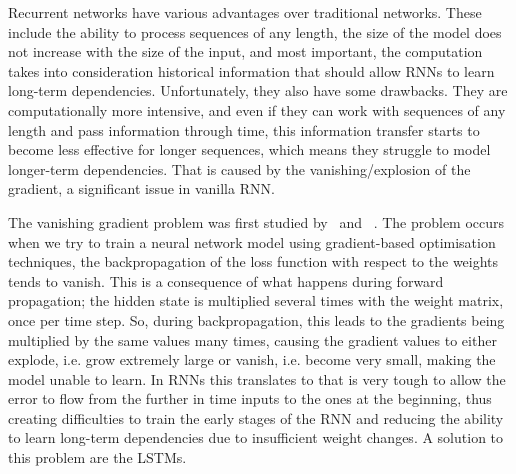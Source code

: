 Recurrent networks have various advantages over traditional networks. These include the ability to process sequences of any length, the size of the model does not increase with the size of the input, and most important, the computation takes into consideration historical information that should allow RNNs to learn long-term dependencies. Unfortunately, they also have some drawbacks. They are computationally more intensive, and even if they can work with sequences of any length and pass information through time, this information transfer starts to become less effective for longer sequences, which means they struggle to model longer-term dependencies. That is caused by the vanishing/explosion of the gradient, a significant issue in vanilla RNN. 

The vanishing gradient problem was first studied by~\cite{Hochreiter:91} and ~\cite{bengio1994vanishing}. The problem occurs when we try to train a neural network model using gradient-based optimisation techniques, the backpropagation of the loss function with respect to the weights tends to vanish. This is a consequence of what happens during forward propagation; the hidden state is multiplied several times with the weight matrix, once per time step. So, during backpropagation, this leads to the gradients being multiplied by the same values many times, causing the gradient values to either explode, i.e. grow extremely large or vanish, i.e. become very small, making the model unable to learn. In RNNs this translates to that is very tough to allow the error to flow from the further in time inputs to the ones at the beginning, thus creating difficulties to train the early stages of the RNN and reducing the ability to learn long-term dependencies due to insufficient weight changes. A solution to this problem are the LSTMs.



